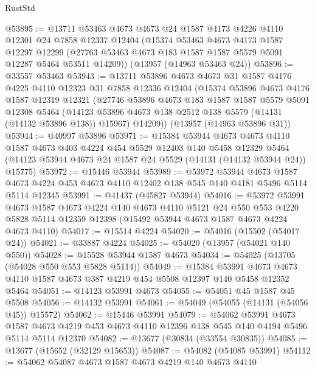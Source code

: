 \begin{lexlean}{RustStd}
\begin{coremodule}
@53895 := @13711
    @53463
    @4673
    @4673
    @24
    @1587
    @4173
    @4226
    @4110
    @12301
    @24
    @7858
    @12337
    @12404
    (@15374
      @53463
      @4673
      @4173
      @1587
      @12297
      @12299
      (@27763 @53463 @4673 @183 @1587 @1587 @5579 @5091 @12287 @5464 @53511 @14209))
    (@13957 (@14963 @53463 @24))
@53896 := @33557 @53463
@53943 := @13711
    @53896
    @4673
    @4673
    @31
    @1587
    @4176
    @4225
    @4110
    @12323
    @31
    @7858
    @12336
    @12404
    (@15374
      @53896
      @4673
      @4176
      @1587
      @12319
      @12321
      (@27746
        @53896
        @4673
        @183
        @1587
        @1587
        @5579
        @5091
        @12308
        @5464
        (@14123 @53896 @4673 @138 @2512 @138 @5579 (@14131 (@14132 @53896 @138)) @15967)
        @14209))
    (@13957 (@14963 @53896 @31))
@53944 := @40997 @53896
@53971 := @15384
    @53944
    @4673
    @4673
    @4110
    @1587
    @4673
    @403
    @4224
    @454
    @5529
    @12403
    @140
    @5458
    @12329
    @5464
    (@14123 @53944 @4673 @24 @1587 @24 @5529 (@14131 (@14132 @53944 @24)) @15775)
@53972 := @15446 @53944
@53989 := @53972
    @53944
    @4673
    @1587
    @4673
    @4224
    @453
    @4673
    @4110
    @12402
    @138
    @545
    @140
    @4181
    @5496
    @5114
    @5114
    @12345
@53991 := @41437 (@45827 @53944)
@54016 := @53972
    @53991
    @4673
    @1587
    @4673
    @4224
    @140
    @4673
    @4110
    @5121
    @24
    @550
    @553
    @4220
    @5828
    @5114
    @12359
    @12398
    (@15492 @53944 @4673 @1587 @4673 @4224 @4673 @4110)
@54017 := @15514 @4224
@54020 := @54016 (@15502 (@54017 @24))
@54021 := @33887 @4224
@54025 := @54020 (@13957 (@54021 @140 @550))
@54028 := @15528 @53944 @1587 @4673
@54034 := @54025 (@13705 (@54028 @550 @553 @5828 @5114))
@54049 := @15384
    @53991
    @4673
    @4673
    @4110
    @1587
    @4673
    @387
    @4219
    @454
    @5508
    @12397
    @140
    @5458
    @12352
    @5464
@54051 := @14123 @53991 @4673
@54055 := @54051 @45 @1587 @45 @5508
@54056 := @14132 @53991
@54061 := @54049 (@54055 (@14131 (@54056 @45)) @15572)
@54062 := @15446 @53991
@54079 := @54062
    @53991
    @4673
    @1587
    @4673
    @4219
    @453
    @4673
    @4110
    @12396
    @138
    @545
    @140
    @4194
    @5496
    @5114
    @5114
    @12370
@54082 := @13677 (@30834 (@33554 @30835))
@54085 := @13677 (@15652 (@32129 @15653))
@54087 := @54082 (@54085 @53991)
@54112 := @54062
    @54087
    @4673
    @1587
    @4673
    @4219
    @140
    @4673
    @4110

\end{coremodule}
\end{lexlean}
